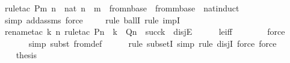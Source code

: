 \begin{isabellebody}
{\isacharparenleft}{\kern0pt}rule{\isacharunderscore}{\kern0pt}tac\ P{\isacharequal}{\kern0pt}{\isachardoublequoteopen}{\isasymlambda}m{\isachardot}{\kern0pt}\ {\isasymforall}n\ {\isasymin}\ nat{\isachardot}{\kern0pt}\ n\ {\isasymle}\ m\ {\isasymlongrightarrow}\ {\isasymDelta}{}{\isacharunderscore}{\kern0pt}from{\isacharcircum}{\kern0pt}n{\isacharparenleft}{\kern0pt}{\isasymDelta}{}{\isacharunderscore}{\kern0pt}base{\isacharparenright}{\kern0pt}\ {\isasymsubseteq}\ {\isasymDelta}{}{\isacharunderscore}{\kern0pt}from{\isacharcircum}{\kern0pt}m{\isacharparenleft}{\kern0pt}{\isasymDelta}{}{\isacharunderscore}{\kern0pt}base{\isacharparenright}{\kern0pt}{\isachardoublequoteclose}\ \ nat{\isacharunderscore}{\kern0pt}induct{\isacharparenright}{\kern0pt}\isanewline
\ \ \ \ \isamarkupfalse%
{\isacharparenleft}{\kern0pt}simp\ add{\isacharcolon}{\kern0pt}assms{\isacharcomma}{\kern0pt}\ force{\isacharparenright}{\kern0pt}\isanewline
\ \ \ \ \isamarkupfalse%
{\isacharparenleft}{\kern0pt}rule\ ballI{\isacharcomma}{\kern0pt}\ rule\ impI{\isacharparenright}{\kern0pt}\isanewline
\ \ \ \ \isamarkupfalse%
{\isacharparenleft}{\kern0pt}rename{\isacharunderscore}{\kern0pt}tac\ k\ n{\isacharcomma}{\kern0pt}\ rule{\isacharunderscore}{\kern0pt}tac\ P{\isacharequal}{\kern0pt}{\isachardoublequoteopen}n\ {\isasymle}\ k{\isachardoublequoteclose}\ \ Q{\isacharequal}{\kern0pt}{\isachardoublequoteopen}n\ {\isacharequal}{\kern0pt}\ succ{\isacharparenleft}{\kern0pt}k{\isacharparenright}{\kern0pt}{\isachardoublequoteclose}\ \ disjE{\isacharparenright}{\kern0pt}\isanewline
\ \ \ \ \isamarkupfalse%
\ le{\isacharunderscore}{\kern0pt}iff\isanewline
\ \ \ \ \ \ \isamarkupfalse%
\ force\isanewline
\ \ \ \ \ \isamarkupfalse%
{\isacharparenleft}{\kern0pt}simp{\isacharcomma}{\kern0pt}\ subst\ {\isasymDelta}{}{\isacharunderscore}{\kern0pt}from{\isacharunderscore}{\kern0pt}def{\isacharparenright}{\kern0pt}\isanewline
\ \ \ \ \ \isamarkupfalse%
{\isacharparenleft}{\kern0pt}rule\ subsetI{\isacharcomma}{\kern0pt}\ simp{\isacharcomma}{\kern0pt}\ rule\ disjI{}{\isacharcomma}{\kern0pt}\ force{\isacharcomma}{\kern0pt}\ force{\isacharparenright}{\kern0pt}\isanewline
\ \ \ \ \isamarkupfalse%
\isanewline
\ \ \isamarkupfalse%
\ \isamarkupfalse%
\ {\isacharquery}{\kern0pt}thesis\ \isanewline
\ \ \ \ \isamarkupfalse%

\end{isabellebody}
